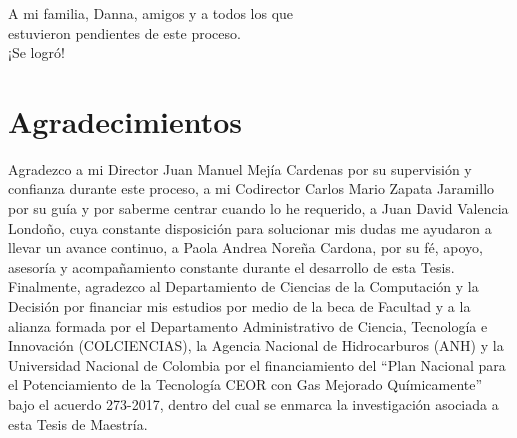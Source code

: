 \newpage{\pagestyle{empty}\cleardoublepage}

\newpage
\thispagestyle{empty} \textbf{}\normalsize
\\\\\\%
~\\[4.0cm]

\begin{flushright}
\begin{minipage}{8cm}
    \noindent
        \small
        ~\\[2.0cm]
        A mi familia, Danna, amigos y a todos los que\\
        estuvieron pendientes de este proceso.\\
        ¡Se logró!
        
\end{minipage}
\end{flushright}

\chapter*{Agradecimientos}
Agradezco a mi Director Juan Manuel Mejía Cardenas por su supervisión y confianza durante este proceso, a mi Codirector Carlos Mario Zapata Jaramillo por su guía y por saberme centrar cuando lo he requerido, a Juan David Valencia Londoño, cuya constante disposición para solucionar mis dudas me ayudaron a llevar un avance continuo, a Paola Andrea Nore\~{n}a Cardona, por su fé, apoyo, asesoría y acompañamiento constante durante el desarrollo de esta Tesis.\\

Finalmente, agradezco al Departamiento de Ciencias de la Computación y la Decisión por financiar mis estudios por medio de la beca de Facultad y a la alianza formada por el Departamento Administrativo de Ciencia, Tecnología e Innovación (COLCIENCIAS), la Agencia Nacional de Hidrocarburos (ANH) y la Universidad Nacional de Colombia por el financiamiento del ``Plan Nacional para el Potenciamiento de la Tecnología CEOR con Gas Mejorado Químicamente'' bajo el acuerdo 273-2017, dentro del cual se enmarca la investigación asociada a esta Tesis de Maestría.

